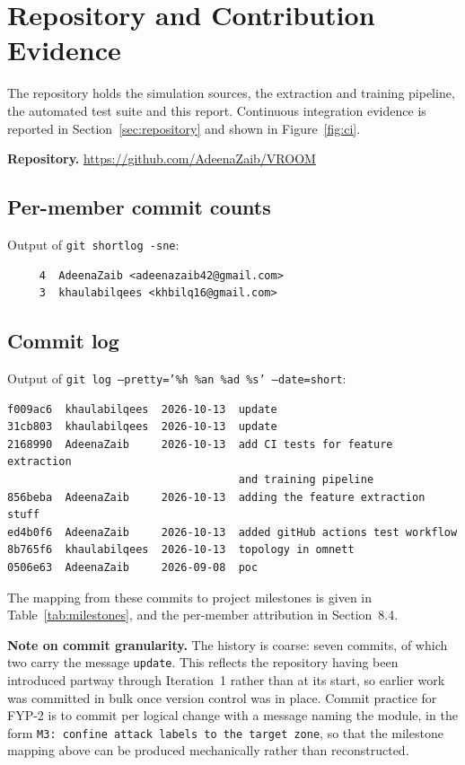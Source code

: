 \chapter{Repository and Contribution Evidence}
The repository holds the simulation sources, the extraction and training pipeline,
the automated test suite and this report. Continuous integration evidence is reported
in Section~\ref{sec:repository} and shown in Figure~\ref{fig:ci}.

\textbf{Repository.} \url{https://github.com/AdeenaZaib/VROOM}

\section*{Per-member commit counts}
Output of \texttt{git shortlog -sne}:

\begin{verbatim}
     4  AdeenaZaib <adeenazaib42@gmail.com>
     3  khaulabilqees <khbilq16@gmail.com>
\end{verbatim}

\section*{Commit log}
Output of \texttt{git log --pretty='\%h \%an \%ad \%s' --date=short}:

\begin{verbatim}
f009ac6  khaulabilqees  2026-10-13  update
31cb803  khaulabilqees  2026-10-13  update
2168990  AdeenaZaib     2026-10-13  add CI tests for feature extraction
                                    and training pipeline
856beba  AdeenaZaib     2026-10-13  adding the feature extraction stuff
ed4b0f6  AdeenaZaib     2026-10-13  added gitHub actions test workflow
8b765f6  khaulabilqees  2026-10-13  topology in omnett
0506e63  AdeenaZaib     2026-09-08  poc
\end{verbatim}

The mapping from these commits to project milestones is given in
Table~\ref{tab:milestones}, and the per-member attribution in Section~8.4.

\textbf{Note on commit granularity.} The history is coarse: seven commits, of which
two carry the message \texttt{update}. This reflects the repository having been
introduced partway through Iteration~1 rather than at its start, so earlier work was
committed in bulk once version control was in place. Commit practice for FYP-2 is to
commit per logical change with a message naming the module, in the form
\texttt{M3: confine attack labels to the target zone}, so that the milestone mapping
above can be produced mechanically rather than reconstructed.

